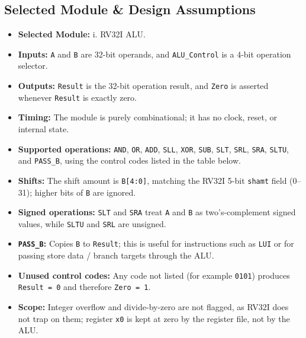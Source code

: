 \documentclass[11pt, a4paper]{article}
\begin{document}
\subsection*{Selected Module \& Design Assumptions}
\begin{itemize}[noitemsep, topsep=2pt]
    \item \textbf{Selected Module:} i. RV32I ALU.
    \item \textbf{Inputs:} \texttt{A} and \texttt{B} are 32-bit operands, and \texttt{ALU\_Control} is a 4-bit operation selector.
    \item \textbf{Outputs:} \texttt{Result} is the 32-bit operation result, and \texttt{Zero} is asserted whenever \texttt{Result} is exactly zero.
    \item \textbf{Timing:} The module is purely combinational; it has no clock, reset, or internal state.
    \item \textbf{Supported operations:} \texttt{AND}, \texttt{OR}, \texttt{ADD}, \texttt{SLL}, \texttt{XOR}, \texttt{SUB}, \texttt{SLT}, \texttt{SRL}, \texttt{SRA}, \texttt{SLTU}, and \texttt{PASS\_B}, using the control codes listed in the table below.
    \item \textbf{Shifts:} The shift amount is \texttt{B[4:0]}, matching the RV32I 5-bit \texttt{shamt} field (0--31); higher bits of \texttt{B} are ignored.
    \item \textbf{Signed operations:} \texttt{SLT} and \texttt{SRA} treat \texttt{A} and \texttt{B} as two's-complement signed values, while \texttt{SLTU} and \texttt{SRL} are unsigned.
    \item \textbf{\texttt{PASS\_B}:} Copies \texttt{B} to \texttt{Result}; this is useful for instructions such as \texttt{LUI} or for passing store data / branch targets through the ALU.
    \item \textbf{Unused control codes:} Any code not listed (for example \texttt{0101}) produces \texttt{Result = 0} and therefore \texttt{Zero = 1}.
    \item \textbf{Scope:} Integer overflow and divide-by-zero are not flagged, as RV32I does not trap on them; register \texttt{x0} is kept at zero by the register file, not by the ALU.
\end{itemize}
\end{document}

